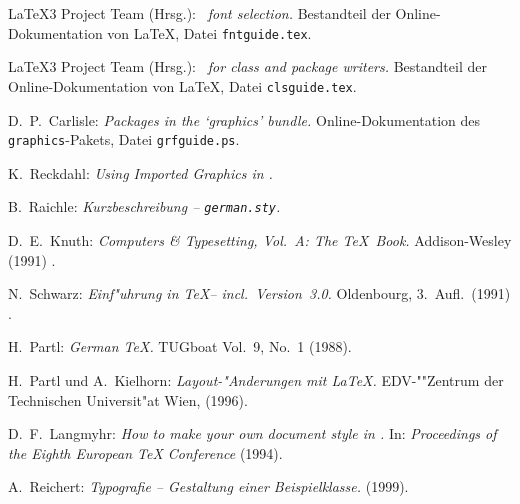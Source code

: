 \documentclass[11pt,a4paper]{article} %
\begin{document}
\begin{thebibliography}{99}
\LaTeX3 Project Team (Hrsg.): 
\textit{\LaTeXe\ font selection.}
Bestandteil der Online-Dokumentation von \LaTeX,
Datei \texttt{fntguide.tex}.

\LaTeX3 Project Team (Hrsg.): 
\textit{\LaTeXe\ for class and package writers.} 
Bestandteil der Online-Dokumentation von \LaTeX,
Datei \texttt{clsguide.tex}.

D.~P.~Carlisle: \textit{Packages in the `graphics' bundle.} 
Online-Dokumentation des \texttt{graphics}-Pakets,
Datei \texttt{grfguide.ps}.

K.~Reckdahl: \textit{Using Imported Graphics in \LaTeXe.} \\


B.~Raichle:
\textit{Kurzbeschreibung -- \texttt{german.sty}.}


D.~E.~Knuth: \textit{Computers \& Typesetting, Vol.\ A: The \TeX{}~Book.}
Addison-Wesley (1991)%
.

N.~Schwarz: \textit{Einf"uhrung in \TeX -- incl.\ Version~3.0.}
Oldenbourg, 3.~Aufl.\ (1991)%
.
 
H.~Partl: \textit{German \TeX.} TUG\-boat Vol.~9, No.~1 (1988).
 
H.~Partl und A.~Kielhorn: \textit{Layout-"Anderungen mit \LaTeX.}
EDV-""Zentrum der Technischen Universit"at Wien,
(1996).

D.~F.~Langmyhr: \textit{How to make your own document style in \LaTeXe.}
In: \textit{Proceedings of the Eighth European \TeX{} Conference}
(1994).

 A.~Reichert: \textit{Typografie -- Gestaltung einer 
Beispielklasse.}  (1999).


\end{thebibliography}
 
\end{document}

